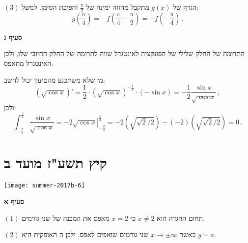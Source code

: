 $(3)$
הגרף של 
$g(x)$
מתקבל מהזזה ימינה של
$\frac{\pi}{2}$
והפיכת הסימן. למשל:
\[
g\left(\frac{\pi}{4}\right)=-f\left(\frac{\pi}{4}-\frac{\pi}{2}\right)=-f\left(-\frac{\pi}{4}\right)\,.
\]
\begin{center}
\end{center}

\textbf{סעיף ג}

התרומה של החלק שלילי של הפונקציה לאינטגרל שווה לתרומה של החלק החיובי שלו, ולכן האינטגרל מתאפס.

מי שלא משתכנע מהטיעון יכול לחשב:
\[
(\sqrt{\cos x})' = \frac{1}{2}\cdot(\sqrt{\cos x})^{-\frac{1}{2}}\cdot (-\sin x)=-\frac{1}{2}\frac{\sin x}{\sqrt{\cos x}}\,,
\]
ולכן:
\[
\int_{-\frac{\pi}{4}}^{\frac{\pi}{4}} \frac{\sin x}{\sqrt{\cos x}}=\left.-2\sqrt{\cos x}\right|_{-\frac{\pi}{4}}^{\frac{\pi}{4}}=-2\left(\sqrt{\sqrt{2}/{2}}\right)-(-2)\left(\sqrt{\sqrt{2}/{2}}\right)=0\,.
\]

\np


\section{קיץ תשע"ז מועד ב}


\begin{center}
\texttt{[image: summer-2017b-6]}
\end{center}

\textbf{סעיף א}

$(1)$
תחום ההגדה הוא
$x\neq 2$
כי
$x=2$
מאפס את המכנה של שני גורמים.

$(2)$
כאשר 
$x\rightarrow \pm\infty$
שני גורמים שואפים לאפס, ולכן ה%
\asm{}
האופקית היא
$y=a$.

